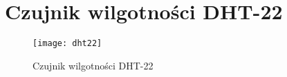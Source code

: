 \chapter{Czujnik wilgotności DHT-22}

\begin{figure}[h]
\centering
\texttt{[image: dht22]}
\caption{Czujnik wilgotności DHT-22}
\label{fig:bmp085_gora}
\end{figure}
